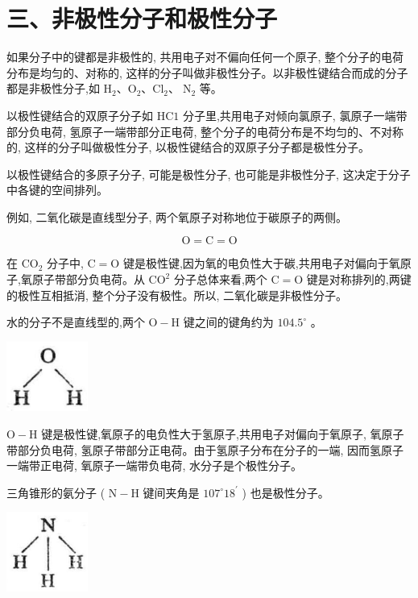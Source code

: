 \documentclass[10pt]{article}
\begin{document}
\section*{三、非极性分子和极性分子}

如果分子中的键都是非极性的, 共用电子对不偏向任何一个原子, 整个分子的电荷分布是均匀的、对称的, 这样的分子叫做非极性分子。以非极性键结合而成的分子都是非极性分子,如 \({\mathrm{H}}_{2}\text{、}{\mathrm{O}}_{2}\text{、}{\mathrm{{Cl}}}_{2}\text{、}{\mathrm{\;N}}_{2}\) 等。

以极性键结合的双原子分子如 \(\mathrm{{HC}}1\) 分子里,共用电子对倾向氯原子, 氯原子一端带部分负电荷, 氢原子一端带部分正电荷, 整个分子的电荷分布是不均匀的、不对称的, 这样的分子叫做极性分子, 以极性键结合的双原子分子都是极性分子。

以极性键结合的多原子分子, 可能是极性分子, 也可能是非极性分子, 这决定于分子中各键的空间排列。

例如, 二氧化碳是直线型分子, 两个氧原子对称地位于碳原子的两侧。

\[
\mathrm{O} = \mathrm{C} = \mathrm{O}
\]

在 \({\mathrm{{CO}}}_{2}\) 分子中, \(\mathrm{C} = \mathrm{O}\) 键是极性键,因为氧的电负性大于碳,共用电子对偏向于氧原子,氧原子带部分负电荷。从 \({\mathrm{{CO}}}^{2}\) 分子总体来看,两个 \(\mathrm{C} = \mathrm{O}\) 键是对称排列的,两键的极性互相抵消, 整个分子没有极性。所以, 二氧化碳是非极性分子。

水的分子不是直线型的,两个 \(\mathrm{O} - \mathrm{H}\) 键之间的键角约为 \({104.5}^{ \circ }\) 。

\begin{center}
\includegraphics[max width=0.2\textwidth]{images/01912d13-9986-7822-a012-3f3f7be99dcb_23_841301.jpg}
\end{center}

\(\mathrm{O} - \mathrm{H}\) 键是极性键,氧原子的电负性大于氢原子,共用电子对偏向于氧原子, 氧原子带部分负电荷, 氢原子带部分正电荷。由于氢原子分布在分子的一端, 因而氢原子一端带正电荷, 氧原子一端带负电荷, 水分子是个极性分子。

三角锥形的氨分子 ( \(\mathrm{N} - \mathrm{H}\) 键间夹角是 \({107}^{ \circ }{18}^{\prime }\) ) 也是极性分子。

\begin{center}
\includegraphics[max width=0.2\textwidth]{images/01912d13-9986-7822-a012-3f3f7be99dcb_23_457605.jpg}
\end{center}
\end{document}
